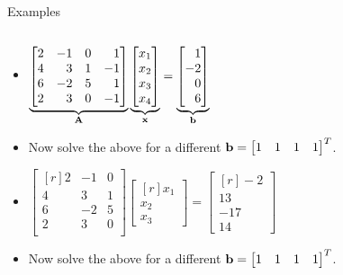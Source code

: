 \documentclass[aspectratio=169]{beamer}
\def\mf{\ensuremath\mathbf}
\begin{document}
\begin{frame}[t]{Examples}
\begin{small}
\begin{columns}[t]
\begin{column}{0.5\textwidth}
\begin{itemize}
    \item $\underbrace{\begin{bmatrix*}[r]
    2 & -1 & 0 & 1\\
    4 & 3 & 1 & -1\\
    6 &-2 & 5 & 1\\
    2 & 3 & 0 & -1\\
    \end{bmatrix*}}_{\mf{A}} \underbrace{\begin{bmatrix*}[r]x_1\\x_2\\x_3\\x_4\end{bmatrix*}}_{\mf{x}} = \underbrace{\begin{bmatrix*}[r]1\\-2\\0\\6\end{bmatrix*}}_{\mf{b}}$
    
    \item Now solve the above for a different $\mf{b} = \begin{bmatrix*}[r]1 & 1 & 1 & 1\end{bmatrix*}^T$.

    \item $\begin{bmatrix*}[r]
    2 & -1 & 0\\
    4 & 3 & 1\\
    6 &-2 & 5\\
    2 & 3 & 0\\
    \end{bmatrix*} \begin{bmatrix*}[r]x_1\\x_2\\x_3\end{bmatrix*} = \begin{bmatrix*}[r]-2\\13\\-17\\14\end{bmatrix*}$

    \item Now solve the above for a different $\mf{b} = \begin{bmatrix*}[r]1 & 1 & 1 & 1\end{bmatrix*}^T$.


\end{itemize}
\end{column}
\end{columns}
\end{small}
\end{frame}
\end{document}
